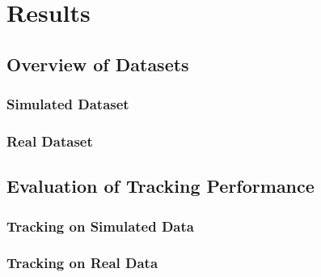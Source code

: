 \chapter{Results}

\section{Overview of Datasets}

\subsection{Simulated Dataset}

\subsection{Real Dataset}

\section{Evaluation of Tracking Performance}

\subsection{Tracking on Simulated Data}

\subsection{Tracking on Real Data}
 